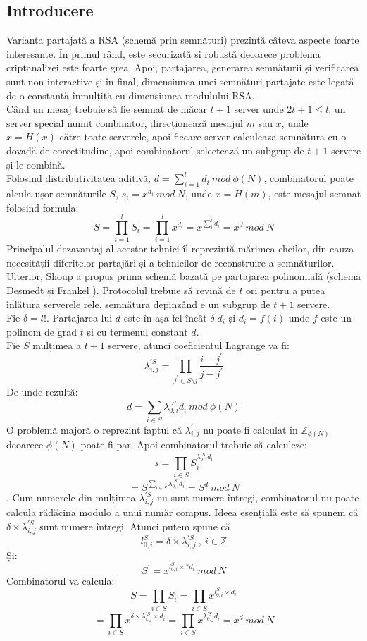 \documentclass[12]{article}
\begin{document}
\subsection{Introducere}
Varianta partajată a RSA (schemă prin semnături) prezintă câteva aspecte foarte interesante. În primul rând, este securizată și robustă deoarece problema criptanalizei este foarte grea. Apoi, partajarea, generarea semnăturii și verificarea sunt non interactive și în final, dimensiunea unei semnături partajate este legată de o constantă înmulțită cu dimensiunea modulului RSA. \\
Când un mesaj trebuie să fie semnat de măcar $ t+1 $ server unde $ 2t+1 \leqslant l $, un server special numit combinator, direcționează mesajul $m$ sau $x$, unde $x=H(x)$ către toate serverele, apoi fiecare server calculează semnătura cu o dovadă de corectitudine, apoi combinatorul selectează un subgrup de $t+1$ servere și le combină. \\
Folosind distributivitatea aditivă, $d=\sum_{i=1}^{l} d_i \ mod \ \phi(N)$, combinatorul poate alcula ușor semnăturile $S$, $s_i=x^{d_i} \ mod \ N$, unde $x=H(m)$, este mesajul semnat folosind formula:
$$ S= \prod_{i=1}^{l} S_i = \prod_{i=1}^{l} x^{d_i} = x^{\sum_{i}^{l} d_i} = x^d \ mod \ N $$
Principalul dezavantaj al acestor tehnici îl reprezintă mărimea cheilor, din cauza necesității diferitelor partajări și a tehnicilor de reconstruire a semnăturilor. Ulterior, Shoup a propus prima schemă bazată pe partajarea polinomială (schema Desmedt și Frankel \cite{desmet}). Protocolul trebuie să revină de $t$ ori pentru a putea înlătura serverele rele, semnătura depinzând e un subgrup de $t+1$ servere. \\
Fie $\delta =l!$. Partajarea lui $d$ este în așa fel încât $\delta | d_i$ și $d_i =f(i)$ unde $f$ este un polinom de grad $t$ și cu termenul constant $d$. \\
Fie $S$ mulțimea a $t+1$ servere, atunci coeficientul Lagrange va fi: 
$$ \lambda_{i,j}^{'S} = \prod_{j^{'} \in S \setminus j}^{} \frac{i-j^{'}}{j-j^{'}}   $$
De unde rezultă:
$$ d= \sum_{i \in S}^{} \lambda_{0,i}^{'S} d_i \ mod \ \phi(N)$$
O problemă majoră o reprezint faptul că $\lambda_{i,j}^{'}$ nu poate fi calculat în $\mathbb{Z}_{\phi(N)}$ deoarece $\phi(N)$ poate fi par. Apoi combinatorul trebuie să calculeze:
$$s=\prod_{i \in S}^{} S_{i}^{\lambda_{0,i}^{'S} d_i}$$
$$ = S^{\sum_{i \in S}^{}\lambda_{0,i}^{'S} d_i} = S^d \ mod \ N$$.
Cum numerele din mulțimea $ \lambda_{i,j}^{'S}$ nu sunt numere întregi, combinatorul nu poate calcula rădăcina modulo a unui număr compus. Ideea esențială este să spunem că $\delta \times \lambda_{i,j}^{'S}$ sunt numere întregi. Atunci putem spune că 
$$l_{0,i}^{S} = \delta \times \lambda_{i,j}^{'S} \ , \ i \in \mathbb{Z} $$
Și:
$$ S^{'} = x^{l_{0,i}^{S} \times * d_i } \ mod \ N   $$
Combinatorul va calcula:
$$S = \prod_{i \in S}^{} S_{i}^{'} = \prod_{i \in S}^{} x^{l_{0,i}^{S} \times d_i    } $$
$$ = \prod_{i \in S}^{}  x^{\delta \times \lambda_{i,j}^{'S} \times d_i} = \prod_{i \in S}^{} 
x^{\lambda_{0,j}^{'S} d_i} = x^d \ mod \ N  $$
\end{document}
